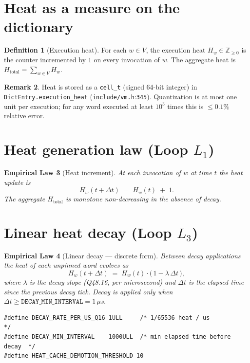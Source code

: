 \documentclass[11pt,letterpaper,openany]{book}
\theoremstyle{definition}
\newtheorem{definition}{Definition}[chapter]
\newtheorem{remark}[definition]{Remark}
\theoremstyle{plain}
\newtheorem{empiricallaw}[definition]{Empirical Law}
\newcommand{\Loop}[1]{L_{#1}}
\newcommand{\sourceref}[2]{\texttt{#1}:\texttt{#2}}
\begin{document}
\section{Heat as a measure on the dictionary}

\begin{definition}[Execution heat]\label{def:heat}
For each $w\in V$, the execution heat $H_w \in \mathbb{Z}_{\ge 0}$ is the
counter incremented by $1$ on every invocation of $w$. The aggregate
heat is $H_{\mathrm{total}} = \sum_{w\in V} H_w$.
\end{definition}

\begin{remark}
Heat is stored as a \texttt{cell\_t} (signed 64-bit integer) in
\texttt{DictEntry.execution\_heat} (\sourceref{include/vm.h}{345}).
Quantization is at most one unit per execution; for any word executed at
least $10^3$ times this is $\le 0.1\%$ relative error.
\end{remark}

\section{Heat generation law (Loop \texorpdfstring{$\Loop{1}$}{L1})}

\begin{empiricallaw}[Heat increment]\label{law:heat-gen}
At each invocation of $w$ at time $t$ the heat update is
\[
  H_w(t+\Delta t) \;=\; H_w(t) \;+\; 1.
\]
The aggregate $H_{\mathrm{total}}$ is monotone non-decreasing in the
absence of decay.
\end{empiricallaw}

\section{Linear heat decay (Loop \texorpdfstring{$\Loop{3}$}{L3})}

\begin{empiricallaw}[Linear decay --- discrete form]\label{law:heat-decay}
Between decay applications the heat of each unpinned word evolves as
\[
  H_w(t+\Delta t) \;=\; H_w(t) \cdot \bigl(\, 1 - \lambda\,\Delta t \,\bigr),
\]
where $\lambda$ is the decay slope (Q48.16, per microsecond) and
$\Delta t$ is the elapsed time since the previous decay tick. Decay is
applied only when $\Delta t \ge \mathtt{DECAY\_MIN\_INTERVAL} = 1\,\mu$s.
\end{empiricallaw}

\begin{lstlisting}[caption={Decay-rate macros (\texttt{include/vm.h}:185--196).}]
#define DECAY_RATE_PER_US_Q16 1ULL     /* 1/65536 heat / us              */
#define DECAY_MIN_INTERVAL    1000ULL  /* min elapsed time before decay  */
#define HEAT_CACHE_DEMOTION_THRESHOLD 10
\end{lstlisting}
\end{document}

